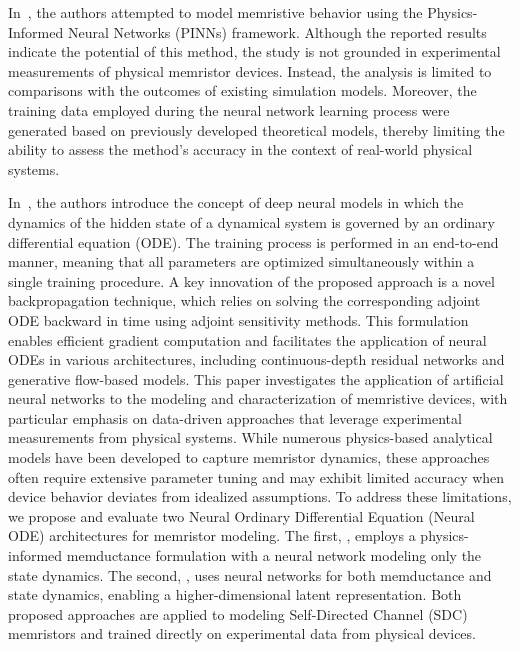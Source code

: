 \documentclass{ieeeaccess}
\begin{document}
In~\cite{Lee2024}, the authors attempted to model memristive behavior using the Physics-Informed Neural Networks (PINNs) framework. Although the reported results indicate the potential of this method, the study is not grounded in experimental measurements of physical memristor devices. Instead, the analysis is limited to comparisons with the outcomes of existing simulation models. Moreover, the training data employed during the neural network learning process were generated based on previously developed theoretical models, thereby limiting the ability to assess the method's accuracy in the context of real-world physical systems.

In~\cite{Ricky2018}, the authors introduce the concept of deep neural models in which the dynamics of the hidden state of a dynamical system is governed by an ordinary differential equation (ODE). The training process is performed in an end-to-end manner, meaning that all parameters are optimized simultaneously within a single training procedure. A key innovation of the proposed approach is a novel backpropagation technique, which relies on solving the corresponding adjoint ODE backward in time using adjoint sensitivity methods. This formulation enables efficient gradient computation and facilitates the application of neural ODEs in various architectures, including continuous-depth residual networks and generative flow-based models.
This paper investigates the application of artificial neural networks to the modeling and characterization of memristive devices, with particular emphasis on data-driven approaches that leverage experimental measurements from physical systems. While numerous physics-based analytical models have been developed to capture memristor dynamics, these approaches often require extensive parameter tuning and may exhibit limited accuracy when device behavior deviates from idealized assumptions. To address these limitations, we propose and evaluate two Neural Ordinary Differential Equation (Neural ODE) architectures for memristor modeling. The first, \MemODEOne, employs a physics-informed memductance formulation with a neural network modeling only the state dynamics. The second, \MemODETwo, uses neural networks for both memductance and state dynamics, enabling a higher-dimensional latent representation. Both proposed approaches are applied to modeling Self-Directed Channel (SDC) memristors and trained directly on experimental data from physical devices.
\end{document}
